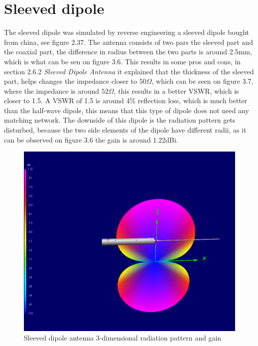 \section{Sleeved dipole}
The sleeved dipole was simulated by reverse engineering a sleeved dipole bought from china, see figure 2.37. The antenna consists of two pars the sleeved part and the coaxial part, the difference in radius between the two parts is around 2.5mm, which is what can be sen on figure 3.6. This results in some pros and cons, in section 2.6.2 \textit{Sleeved Dipole Antenna} it explained that the thickness of the sleeved part, helps changes the impedance closer to $50\Omega$, which can be seen on figure 3.7, where the impedance is around $52\Omega$, this results in a better VSWR, which is closer to 1.5. A VSWR of 1.5 is around 4\% reflection loss, which is much better than the half-wave dipole, this means that this type of dipole does not need any matching network. The downside of this dipole is the radiation pattern gets disturbed, because the two side elements of the dipole have different radii, as it can be observed on figure 3.6 the gain is around 1.22dBi. 

\begin{figure}[h!]
\centering
\includegraphics[scale=0.6]{figures/SleevedDipoleRad.PNG}
\caption{Sleeved dipole antenna 3-dimensional radiation pattern and gain}
\end{figure}

